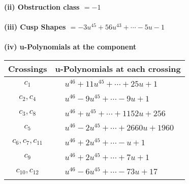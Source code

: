 \documentclass[1p]{elsarticle_modified}
\theoremstyle{definition}
\begin{document}
\flushleft \textbf{(ii) Obstruction class $= -1$}\\~\\
\flushleft \textbf{(iii) Cusp Shapes $= -3 u^{45}+56 u^{43}+\cdots-5 u-1$}\\~\\
\newpage\renewcommand{\arraystretch}{1}
\flushleft \textbf{(iv) u-Polynomials at the component}\newline \\
\begin{tabular}{m{50pt}|m{274pt}}
Crossings & \hspace{64pt}u-Polynomials at each crossing \\
\hline $$\begin{aligned}c_{1}\end{aligned}$$&$\begin{aligned}
&u^{46}+11 u^{45}+\cdots+25 u+1
\end{aligned}$\\
\hline $$\begin{aligned}c_{2},c_{4}\end{aligned}$$&$\begin{aligned}
&u^{46}-9 u^{45}+\cdots-9 u+1
\end{aligned}$\\
\hline $$\begin{aligned}c_{3},c_{8}\end{aligned}$$&$\begin{aligned}
&u^{46}+u^{45}+\cdots+1152 u+256
\end{aligned}$\\
\hline $$\begin{aligned}c_{5}\end{aligned}$$&$\begin{aligned}
&u^{46}-2 u^{45}+\cdots+2660 u+1960
\end{aligned}$\\
\hline $$\begin{aligned}c_{6},c_{7},c_{11}\end{aligned}$$&$\begin{aligned}
&u^{46}+2 u^{45}+\cdots- u+1
\end{aligned}$\\
\hline $$\begin{aligned}c_{9}\end{aligned}$$&$\begin{aligned}
&u^{46}+2 u^{45}+\cdots+7 u+1
\end{aligned}$\\
\hline $$\begin{aligned}c_{10},c_{12}\end{aligned}$$&$\begin{aligned}
&u^{46}-6 u^{45}+\cdots-73 u+17
\end{aligned}$\\
\hline
\end{tabular}\\~\\
\end{document}
